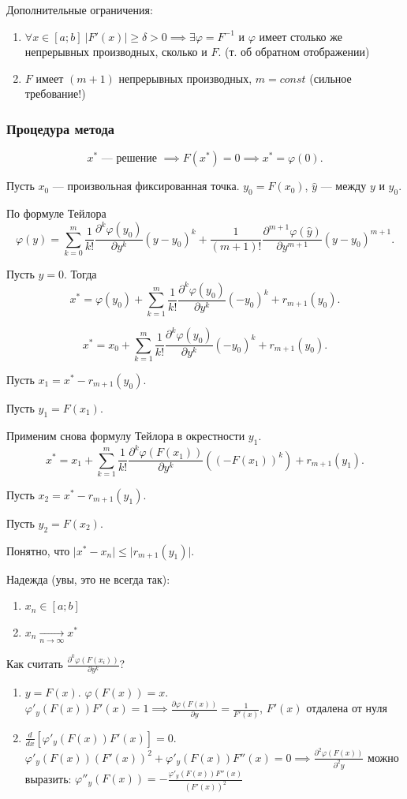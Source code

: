 Дополнительные ограничения:
\begin{enumerate}
	\item $\forall x \in [a; b]\ \left| F'(x) \right| \ge \delta > 0 \implies \exists \varphi = F^{-1}$ и $\varphi$ имеет столько же непрерывных производных, сколько и $F$. (т. об обратном отображении)
	\item $F$ имеет $(m+1)$ непрерывных производных, $m = const$ (сильное требование!)
\end{enumerate}
\subsubsection{Процедура метода}
\[
	x^* \text{ --- решение } \implies F(x^*) = 0 \implies x^* = \varphi(0).
\]

Пусть $x_0$ --- произвольная фиксированная точка. $y_0 = F(x_0)$, $\hat{y}$ --- между $y$ и $y_0$.

По формуле Тейлора
\[
	\varphi(y) = \sum\limits_{k = 0}^m \frac{1}{k!} \frac{\partial^k \varphi(y_0)}{\partial y^k} (y-y_0)^k + \frac{1}{(m+1)!}\frac{\partial^{m+1}\varphi(\hat{y})}{\partial y^{m+1}}(y-y_0)^{m+1}.
\]

Пусть $y=0$. Тогда
\[
	x^* = \varphi(y_0) + \sum\limits_{k = 1}^m \frac{1}{k!} \frac{\partial^k \varphi(y_0)}{\partial y^k}(-y_0)^k + r_{m+1}(y_0).
\]

\[
	x^* = x_0 + \sum\limits_{k = 1}^m \frac{1}{k!} \frac{\partial^k \varphi(y_0)}{\partial y^k}(-y_0)^k + r_{m+1}(y_0).
\]

Пусть $x_1 = x^* - r_{m+1}(y_0)$.

Пусть $y_1 = F(x_1)$.

Применим снова формулу Тейлора в окрестности $y_1$.
\[
	x^* = x_1 + \sum\limits_{k=1}^m \frac{1}{k!}\frac{\partial^k\varphi(F(x_1))}{\partial y^k}((-F(x_1))^k) + r_{m+1}(y_1).
\]

Пусть $x_2 = x^* - r_{m+1}(y_1)$.

Пусть $y_2 = F(x_2)$.

Понятно, что $\vert x^* - x_{n}\vert \leq \vert r_{m+1}(y_1) \vert$.


Надежда (увы, это не всегда так):
\begin{enumerate}
	\item $x_n \in [a; b]$
	\item $x_n \underset{n \to \infty}{\longrightarrow} x^*$
\end{enumerate}

Как считать $\frac{\partial^k \varphi(F(x_i))}{\partial y^k}$?
\begin{enumerate}
	\item $y=F(x)$. $\varphi(F(x)) = x$. $\varphi'_y (F(x))F'(x) = 1 \implies \frac{\partial \varphi (F(x))}{\partial y} = \frac{1}{F'(x)}$, $F'(x)$ отдалена от нуля
	\item $\frac{d}{dx}[\varphi'_y (F(x))F'(x)] = 0$. $\varphi'_y (F(x))(F'(x))^2 + \varphi'_y (F(x))F''(x) = 0 \implies \frac {\partial^2 \varphi(F(x))}{\partial^2 y}$ можно выразить: $\varphi''_y (F(x)) = - \frac {\varphi'_y(F(x))F''(x)}{(F'(x))^2}$
\end{enumerate}


